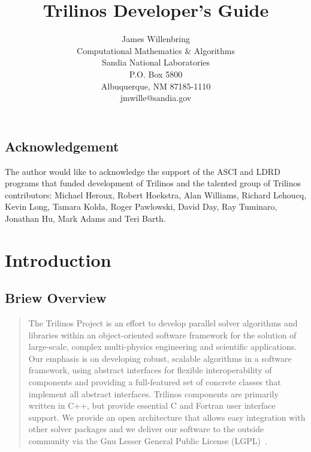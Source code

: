 \documentclass[12pt]{report}
\title{Trilinos Developer's Guide}
\author{James Willenbring\\
       Computational Mathematics \& Algorithms \\
	  Sandia National Laboratories\\
	  P.O. Box 5800\\
	  Albuquerque, NM 87185-1110 \\
	  jmwille@sandia.gov \\
	 }
\begin{document}
	\maketitle

%
%

    \pagestyle{headings}

    \section*{Acknowledgement}
The author would like to acknowledge the support of the ASCI and LDRD programs 
that funded development of Trilinos and the talented group of Trilinos 
contributors: Michael Heroux, Robert Hoekstra, Alan Williams, Richard Lehoucq, 
Kevin Long, Tamara Kolda, Roger Pawlowski, David Day, Ray Tuminaro, 
Jonathan Hu, Mark Adams and Teri Barth.

    \clearpage
    \tableofcontents
    \listoffigures
    \listoftables



%
    \chapter{Introduction}
	\section{Briew Overview}
	\begin{quote}
The Trilinos Project is an effort to develop parallel solver algorithms and 
libraries within 
an object-oriented software framework for the solution of large-scale, complex
multi-physics engineering and scientific applications.   Our emphasis is on 
developing robust, scalable algorithms in a software framework, using abstract 
interfaces for flexible interoperability of components and providing a 
full-featured set of concrete classes that implement all abstract interfaces. 
Trilinos components are primarily written in C++, but provide essential C and 
Fortran user interface support.  We provide an open architecture that allows 
easy integration with other solver packages and we deliver our software to 
the outside community via the Gnu Lesser General Public License
(LGPL)~\cite{gnu-license-site}.
	\end{quote}
\end{document}

